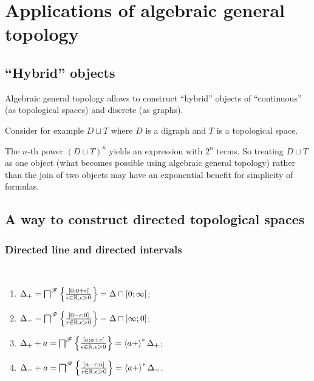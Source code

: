 \chapter{Applications of algebraic general topology}


\section{``Hybrid'' objects}

Algebraic general topology allows to construct ``hybrid'' objects of ``continuous'' (as topological spaces)
and discrete (as graphs).

Consider for example $D\sqcup T$ where $D$ is a digraph and $T$ is a topological space.

The $n$-th power $(D\sqcup T)^n$ yields an expression with $2^n$ terms.
So treating $D\sqcup T$ as one object (what becomes possible using algebraic general topology)
rather than the join of two objects may have an exponential benefit for simplicity of formulas.

\section{A way to construct directed topological spaces}

\subsection{Directed line and directed intervals}

\begin{defn}~
\begin{enumerate}
\item $\Delta_{+} = \bigsqcap^{\mathscr{F}} \left\{ \frac{[0;0+\epsilon[}{\epsilon\in\mathbb{R}, \epsilon>0}\right\} = \Delta\sqcap [0;\infty\mathclose[$;
\item $\Delta_{-} = \bigsqcap^{\mathscr{F}} \left\{ \frac{]0-\epsilon;0]}{\epsilon\in\mathbb{R}, \epsilon>0}\right\} = \Delta\sqcap \mathopen]\infty;0]$;
\item $\Delta_{+} + a = \bigsqcap^{\mathscr{F}} \left\{ \frac{[a;a+\epsilon[}{\epsilon\in\mathbb{R}, \epsilon>0}\right\} = \left\langle a+\right\rangle ^{\ast}\Delta_+$;
\item $\Delta_{-} + a = \bigsqcap^{\mathscr{F}} \left\{ \frac{]a-\epsilon;a]}{\epsilon\in\mathbb{R}, \epsilon>0}\right\} = \left\langle a+\right\rangle ^{\ast}\Delta_-$.
\end{enumerate}
\end{defn}

